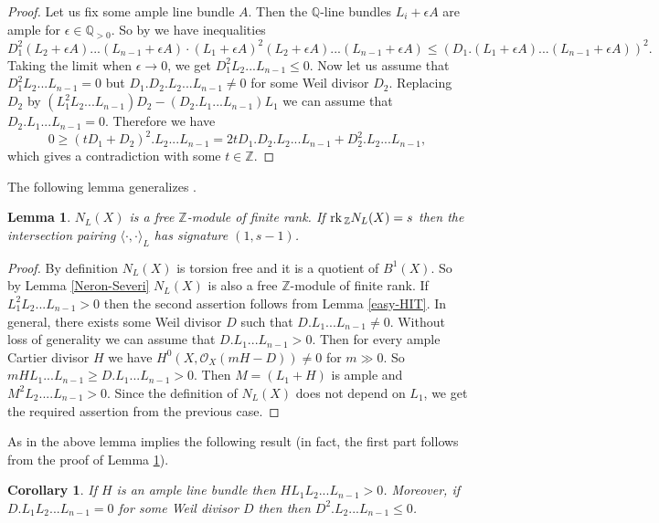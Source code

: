 \documentclass[12pt]{article}
\theoremstyle{plain}
\newtheorem{Corollary}[Thm]{\sc Corollary}
\newtheorem{Lemma}[Thm]{\sc Lemma}
\theoremstyle{definition}
\theoremstyle{remark}
\newcommand{\ZZ}{{\mathbb Z}}
\newcommand{\QQ}{{\mathbb Q}}
\newcommand{\cO}{{\mathcal O}}
\newcommand{\rk}{{\mathop{\rm rk \,}}}
\begin{document}
\begin{proof}
	Let us fix some ample line bundle $A$. Then the $\QQ$-line bundles $L_i+\epsilon A$ are ample for $\epsilon\in \QQ_{>0}$. So by \cite[Lemma 2.6]{La-Chern} we have inequalities
	$$D_1^2(L_2+\epsilon A) ...(L_{n-1}+\epsilon A)\cdot  (L_1+\epsilon A)^2(L_2+\epsilon A) ...(L_{n-1}+\epsilon A) \le \left( D_1.(L_1+\epsilon A) ...(L_{n-1}+\epsilon A) \right)^2.$$
	Taking the limit when $\epsilon\to 0$, we get  $D_1^2L_2...L_{n-1}\le 0$. Now let us assume that 	
	$D_1^2L_2...L_{n-1}= 0$ but
	$D_1.D_2.L_2...L_{n-1}\ne 0$ for some Weil divisor $D_2$. Replacing $D_2$ by $(L_1^2L_2...L_{n-1})D_2-(D_2.L_1...L_{n-1})L_1$
	we can assume that $D_2.L_1...L_{n-1}=0$.
	Therefore we have
	$$0\ge (tD_1+D_2)^2.L_2...L_{n-1}=2t D_1.D_2.L_2...L_{n-1}+D_2^2.L_2...L_{n-1},$$
	which gives a contradiction with some $t\in \ZZ$.	
\end{proof}

\medskip

The following lemma generalizes  \cite[Lemma 2.6]{La-Chern}.


\begin{Lemma}\label{HIT}
$N_L (X)$ is a free $\ZZ$-module of finite rank. If  $\rk _{\ZZ} N_L (X)=s$ then the intersection pairing $\langle \cdot , \cdot \rangle _L$ has signature $(1, s-1)$. 
\end{Lemma}
 
\begin{proof}
By definition $N_L(X)$ is torsion free and it is a quotient of $B^1 (X)$. So by Lemma \ref{Neron-Severi} $N_L(X)$  is also a free $\ZZ$-module of finite rank. 
If $L_1^2L_2...L_{n-1}>0$ then  the second assertion follows from Lemma \ref{easy-HIT}.
In general,  there exists some Weil divisor $D$ such that $D.L_1...L_{n-1}\ne 0$. Without loss of generality we can assume that 
$D.L_1...L_{n-1}>0$. Then for every ample Cartier divisor $H$ we have $H^0(X,\cO_X(mH-D))\ne 0$ 
for $m\gg 0$. So  $mHL_1...L_{n-1}\ge D.L_1...L_{n-1}>0$. Then $M=(L_1+H)$ is ample and $M^2L_2....L_{n-1}>0$.  Since  the definition of $N_L(X)$ does not depend on $L_1$, we get the required assertion from the previous case.
\end{proof}
 
As in \cite[Lemma 2.1]{La7} the above lemma implies the following result (in fact, the first part follows from the proof of Lemma \ref{HIT}). 
 
\begin{Corollary}\label{HIT2}
If $H$ is an ample line bundle then $HL_1L_2...L_{n-1}>0$. Moreover, if
$D.L_1L_2...L_{n-1}=0$ for some Weil divisor $D$ then
then  $D^2.L_2...L_{n-1}\le 0$.
\end{Corollary}
\end{document}
